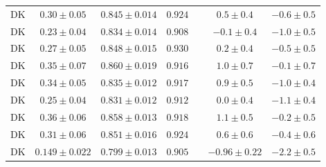 \documentclass[12pt,oneside,letterpaper]{article}
\begin{document}
\begin{table}
\begin{center}
\begin{tabular}{*{7}{c}}
		DK&$0.30 \pm 0.05$&$0.845 \pm 0.014$&$0.924$&&$0.5 \pm 0.4$&$-0.6 \pm 0.5$\\
		DK&$0.23 \pm 0.04$&$0.834 \pm 0.014$&$0.908$&&$-0.1 \pm 0.4$&$-1.0 \pm 0.5$\\
		DK&$0.27 \pm 0.05$&$0.848 \pm 0.015$&$0.930$&&$0.2 \pm 0.4$&$-0.5 \pm 0.5$\\
		DK&$0.35 \pm 0.07$&$0.860 \pm 0.019$&$0.916$&&$1.0 \pm 0.7$&$-0.1 \pm 0.7$\\
		DK&$0.34 \pm 0.05$&$0.835 \pm 0.012$&$0.917$&&$0.9 \pm 0.5$&$-1.0 \pm 0.4$\\
		DK&$0.25 \pm 0.04$&$0.831 \pm 0.012$&$0.912$&&$0.0 \pm 0.4$&$-1.1 \pm 0.4$\\
		DK&$0.36 \pm 0.06$&$0.858 \pm 0.013$&$0.918$&&$1.1 \pm 0.5$&$-0.2 \pm 0.5$\\
		DK&$0.31 \pm 0.06$&$0.851 \pm 0.016$&$0.924$&&$0.6 \pm 0.6$&$-0.4 \pm 0.6$\\
		DK&$0.149 \pm 0.022$&$0.799 \pm 0.013$&$0.905$&&$-0.96 \pm 0.22$&$-2.2 \pm 0.5$\\
	    \hline
    	\hline
    \end{tabular}
  \end{center}
    \label{tab:Kwash}
\end{table}

\clearpage
\end{document}
